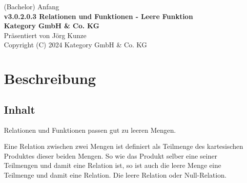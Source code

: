 \documentclass[a4paper]{amsart}
\theoremstyle{definition}
\begin{document}
\begin{titlepage}
\centering
{\huge
(Bachelor) Anfang\\[1cm]
\textbf{v3.0.2.0.3 Relationen und Funktionen - Leere Funktion}
}\\[1cm]

\textbf{Kategory GmbH \& Co. KG}\\
Präsentiert von Jörg Kunze\\
Copyright (C) 2024 Kategory GmbH \& Co. KG

\end{titlepage}

%

\newpage

\section*{Beschreibung}

\subsection*{Inhalt}
Relationen und Funktionen passen gut zu leeren Mengen.

Eine Relation zwischen zwei Mengen ist definiert als Teilmenge des kartesischen Produktes dieser beiden Mengen. So wie das Produkt selber eine seiner Teilmengen und damit eine Relation ist, so ist auch die leere Menge eine Teilmenge und damit eine Relation. Die leere Relation oder Null-Relation.
\end{document}

